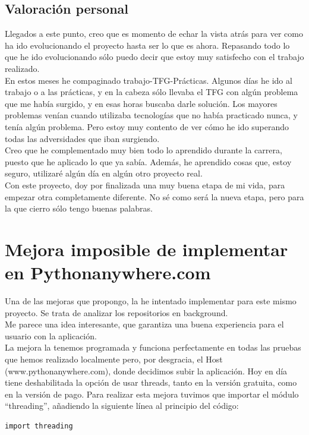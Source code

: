 \documentclass[a4paper, 12pt]{book}
\begin{document}
\section{Valoración personal}
\label{sec:valoracion}

Llegados a este punto, creo que es momento de echar la vista atrás para ver como ha ido evolucionando el proyecto hasta ser lo que es ahora. Repasando todo lo que he ido evolucionando sólo puedo decir que estoy muy satisfecho con el trabajo realizado.\\
En estos meses he compaginado trabajo-TFG-Prácticas. Algunos días he ido al trabajo o a las prácticas, y en la cabeza sólo llevaba el TFG con algún problema que me había surgido, y en esas horas buscaba darle solución. Los mayores problemas venían cuando utilizaba tecnologías que no había practicado nunca, y tenía algún problema. Pero estoy muy contento de ver cómo he ido superando todas las adversidades que iban surgiendo.\\
Creo que he complementado muy bien todo lo aprendido durante la carrera, puesto que he aplicado lo que ya sabía. Además, he aprendido cosas que, estoy seguro, utilizaré algún día en algún otro proyecto real.\\
Con este proyecto, doy por finalizada una muy buena etapa de mi vida, para empezar otra completamente diferente. No sé como será la nueva etapa, pero para la que cierro sólo tengo buenas palabras.




\cleardoublepage
\appendix
\chapter{Mejora imposible de implementar en Pythonanywhere.com}
\label{app:Trabajo en Background}

Una de las mejoras que propongo, la he intentado implementar para este mismo proyecto. Se trata de analizar los repositorios en background.\\
Me parece una idea interesante, que garantiza una buena experiencia para el usuario con la aplicación.\\
La mejora la tenemos programada y funciona perfectamente en todas las pruebas que hemos realizado localmente pero, por desgracia, el Host (www.pythonanywhere.com), donde decidimos subir la aplicación. Hoy en día tiene deshabilitada la opción de usar threads, tanto en la versión gratuita, como en la versión de pago.
Para realizar esta mejora tuvimos que importar el módulo ``threading'', añadiendo la siguiente línea al principio del código:
\lstset{language=python, breaklines=true, basicstyle=\footnotesize}
\begin{lstlisting}[frame=single]
import threading
\end{lstlisting}
\end{document}
